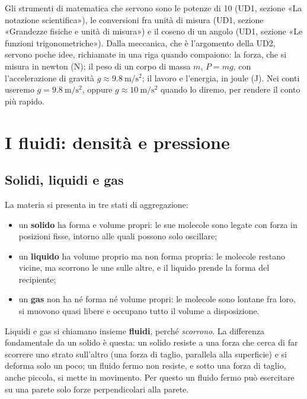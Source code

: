 Gli strumenti di matematica che servono sono le potenze di 10 (UD1, sezione «La notazione scientifica»), le conversioni fra unità di misura (UD1, sezione «Grandezze fisiche e unità di misura») e il coseno di un angolo (UD1, sezione «Le funzioni trigonometriche»). Dalla meccanica, che è l'argomento della UD2, servono poche idee, richiamate in una riga quando compaiono: la forza, che si misura in newton (\si{\newton}); il peso di un corpo di massa $m$, $P = mg$, con l'accelerazione di gravità $g \approx \SI{9,8}{\metre\per\second\squared}$; il lavoro e l'energia, in joule (\si{\joule}). Nei conti useremo $g = \SI{9,8}{\metre\per\second\squared}$, oppure $g \approx \SI{10}{\metre\per\second\squared}$ quando lo diremo, per rendere il conto più rapido.

\section{I fluidi: densità e pressione}
\label{sec:ud3-fluidi}

\subsection{Solidi, liquidi e gas}

La materia si presenta in tre stati di aggregazione:
\begin{itemize}
  \item un \textbf{solido} ha forma e volume propri: le sue molecole sono legate con forza in posizioni fisse, intorno alle quali possono solo oscillare;
  \item un \textbf{liquido} ha volume proprio ma non forma propria: le molecole restano vicine, ma scorrono le une sulle altre, e il liquido prende la forma del recipiente;
  \item un \textbf{gas} non ha né forma né volume propri: le molecole sono lontane fra loro, si muovono quasi libere e occupano tutto il volume a disposizione.
\end{itemize}
Liquidi e gas si chiamano insieme \textbf{fluidi}, perché \emph{scorrono}. La differenza fondamentale da un solido è questa: un solido resiste a una forza che cerca di far scorrere uno strato sull'altro (una forza di taglio, parallela alla superficie) e si deforma solo un poco; un fluido fermo non resiste, e sotto una forza di taglio, anche piccola, si mette in movimento. Per questo un fluido fermo può esercitare su una parete solo forze perpendicolari alla parete.

